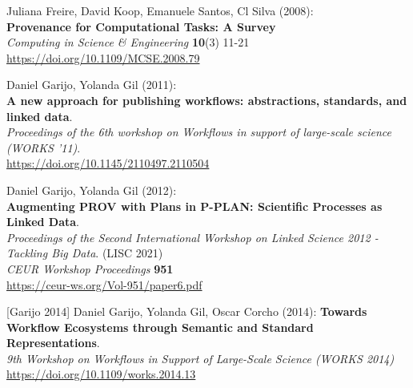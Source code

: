 \documentclass[10pt,letterpaper]{article}
\begin{document}
\begin{thebibliography}{10}
\begin{small}
Juliana Freire, David Koop, Emanuele Santos, Cl Silva (2008):\\
\textbf{Provenance for Computational Tasks: A Survey}\\
\emph{Computing in Science \& Engineering} \textbf{10}(3) 11-21\\
\url{https://doi.org/10.1109/MCSE.2008.79}

Daniel Garijo, Yolanda Gil (2011):\\
\textbf{A new approach for publishing workflows: abstractions, standards, and linked data}.\\
\emph{Proceedings of the 6th workshop on Workflows in support of large-scale science (WORKS '11)}.\\
\url{https://doi.org/10.1145/2110497.2110504}

Daniel Garijo, Yolanda Gil (2012):\\
\textbf{Augmenting PROV with Plans in P-PLAN: Scientific Processes as Linked Data}.\\
\emph{Proceedings of the Second International Workshop on Linked Science 2012 - Tackling Big Data}. (LISC 2021)\\
\emph{CEUR Workshop Proceedings} \textbf{951}\\
\url{https://ceur-ws.org/Vol-951/paper6.pdf}

[Garijo 2014] Daniel Garijo, Yolanda Gil, Oscar Corcho (2014):
\textbf{Towards Workflow Ecosystems through Semantic and Standard Representations}.\\
\emph{9th Workshop on Workflows in Support of Large-Scale Science (WORKS 2014)}\\
\url{https://doi.org/10.1109/works.2014.13} 


\end{small}
\end{thebibliography}
\end{document}
